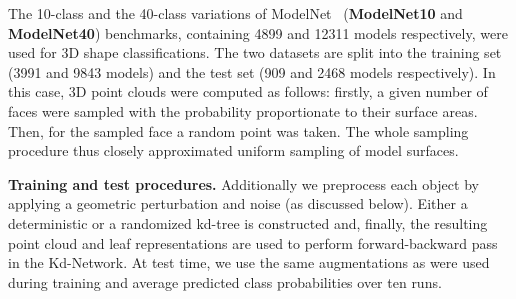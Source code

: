 \documentclass[10pt,twocolumn,letterpaper]{article}
\begin{document}
\begin{table}
  \begin{center}
  \tabcolsep=0.11cm
   \end{center}
  \caption{Classification accuracy for baselines and different data augmentations. The resulting accuracies for the baseline model, the ablated model with trivial leaf representations, as well as Kd-networks trained with various data augmentations. DT = deterministic kd-trees, RT = randomized kd-trees, TA = translation augmentation, SA = anisotropic scaling augmentation. All networks are depth 10. See text for discussion. }
  \label{tab:class_int}
\end{table}

The 10-class and the 40-class variations of ModelNet~\cite{Wu15} (\textbf{ModelNet10} and \textbf{ModelNet40}) benchmarks, containing 4899 and 12311 models respectively, were used for 3D shape classifications. The two datasets are split into the training set (3991 and 9843 models) and the test set (909 and 2468 models respectively). In this case, 3D point clouds were computed as follows: firstly, a given number of faces were sampled with the probability proportionate to their surface areas. Then, for the sampled face a random point was taken. The whole sampling procedure thus closely approximated uniform sampling of model surfaces.

\textbf{Training and test procedures.} Additionally we preprocess each object by applying a geometric perturbation and noise (as discussed below). Either a deterministic or a randomized kd-tree is constructed and, finally, the resulting point cloud and leaf representations are used to perform forward-backward pass in the Kd-Network. At test time, we use the same augmentations as were used during training and average predicted class probabilities over ten runs.
\end{document}
